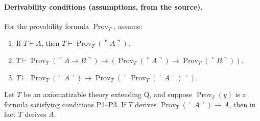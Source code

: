 \paragraph{Derivability conditions (assumptions, from the source).}
For the provability formula $\operatorname{Prov}_T$, assume:
\begin{enumerate}[label=P\arabic*.]
\item If $T\vdash A$, then $T\vdash\operatorname{Prov}_T(\ulcorner A\urcorner)$.
\item $T\vdash\operatorname{Prov}_T(\ulcorner A\to B\urcorner)\to(\operatorname{Prov}_T(\ulcorner A\urcorner)\to\operatorname{Prov}_T(\ulcorner B\urcorner))$.
\item $T\vdash\operatorname{Prov}_T(\ulcorner A\urcorner)\to\operatorname{Prov}_T(\ulcorner\operatorname{Prov}_T(\ulcorner A\urcorner)\urcorner)$.
\end{enumerate}
\begin{theorem}
Let $T$ be an axiomatizable theory extending $\mathrm Q$, and suppose $\operatorname{Prov}_T(y)$ is a formula satisfying conditions P1--P3. If $T$ derives $\operatorname{Prov}_T(\ulcorner A\urcorner)\to A$, then in fact $T$ derives $A$.
\end{theorem}
